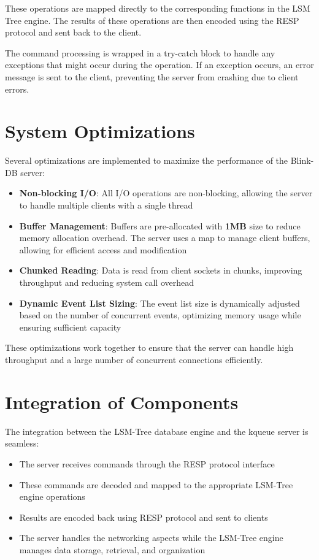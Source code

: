 \documentclass{article}
\begin{document}
\noindent These operations are mapped directly to the corresponding functions in the LSM Tree engine. The results of these operations are then encoded using the RESP protocol and sent back to the client.

\noindent The command processing is wrapped in a try-catch block to handle any exceptions that might occur during the operation. If an exception occurs, an error message is sent to the client, preventing the server from crashing due to client errors.

\section{System Optimizations}

Several optimizations are implemented to maximize the performance of the Blink-DB server:

\begin{itemize}
    \item \textbf{Non-blocking I/O}: All I/O operations are non-blocking, allowing the server to handle multiple clients with a single thread
    \item \textbf{Buffer Management}: Buffers are pre-allocated with \textbf{1MB} size to reduce memory allocation overhead. The server uses a map to manage client buffers, allowing for efficient access and modification
    \item \textbf{Chunked Reading}: Data is read from client sockets in chunks, improving throughput and reducing system call overhead
    \item \textbf{Dynamic Event List Sizing}: The event list size is dynamically adjusted based on the number of concurrent events, optimizing memory usage while ensuring sufficient capacity
\end{itemize}

\noindent These optimizations work together to ensure that the server can handle high throughput and a large number of concurrent connections efficiently.

\section{Integration of Components}

The integration between the LSM-Tree database engine and the kqueue server is seamless:

\begin{itemize}
    \item The server receives commands through the RESP protocol interface
    \item These commands are decoded and mapped to the appropriate LSM-Tree engine operations
    \item Results are encoded back using RESP protocol and sent to clients
    \item The server handles the networking aspects while the LSM-Tree engine manages data storage, retrieval, and organization
\end{itemize}
\end{document}
